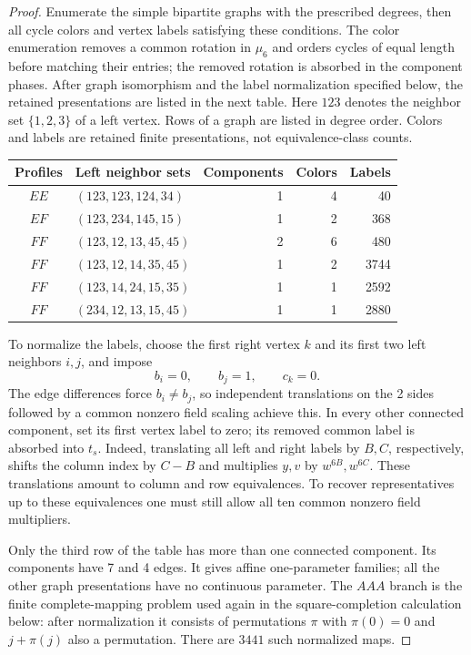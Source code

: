 \documentclass[11pt,a4paper]{article}
\numberwithin{equation}{section}
\begin{document}
\begin{proof}
\medskip
Enumerate the simple bipartite graphs with the prescribed degrees, then all cycle colors and vertex labels satisfying these conditions. The color enumeration removes a common rotation in $\mu_6$ and orders cycles of equal length before matching their entries; the removed rotation is absorbed in the component phases. After graph isomorphism and the label normalization specified below, the retained presentations are listed in the next table. Here $123$ denotes the neighbor set $\{1,2,3\}$ of a left vertex. Rows of a graph are listed in degree order. Colors and labels are retained finite presentations, not equivalence-class counts.
\begin{samepage}
\begin{center}
\small
\begin{tabular}{@{}clrrr@{}}
\toprule
Profiles & Left neighbor sets & Components & Colors & Labels\\
\midrule
$EE$ & $(123,123,124,34)$ & 1 & 4 & 40\\
$EF$ & $(123,234,145,15)$ & 1 & 2 & 368\\
$FF$ & $(123,12,13,45,45)$ & 2 & 6 & 480\\
$FF$ & $(123,12,14,35,45)$ & 1 & 2 & 3744\\
$FF$ & $(123,14,24,15,35)$ & 1 & 1 & 2592\\
$FF$ & $(234,12,13,15,45)$ & 1 & 1 & 2880\\
\bottomrule
\end{tabular}
\end{center}
\end{samepage}
To normalize the labels, choose the first right vertex $k$ and its first two left neighbors $i,j$, and impose
$$b_i=0,\qquad b_j=1,\qquad c_k=0.$$
The edge differences force $b_i\ne b_j$, so independent translations on the 2 sides followed by a common nonzero field scaling achieve this. In every other connected component, set its first vertex label to zero; its removed common label is absorbed into $t_s$. Indeed, translating all left and right labels by $B,C$, respectively, shifts the column index by $C-B$ and multiplies $y,v$ by $w^{6B},w^{6C}$. These translations amount to column and row equivalences. To recover representatives up to these equivalences one must still allow all ten common nonzero field multipliers.

Only the third row of the table has more than one connected component. Its components have 7 and 4 edges. It gives affine one-parameter families; all the other graph presentations have no continuous parameter. The $AAA$ branch is the finite complete-mapping problem used again in the square-completion calculation below: after normalization it consists of permutations $\pi$ with $\pi(0)=0$ and $j+\pi(j)$ also a permutation. There are $3441$ such normalized maps.
\end{proof}
\end{document}
